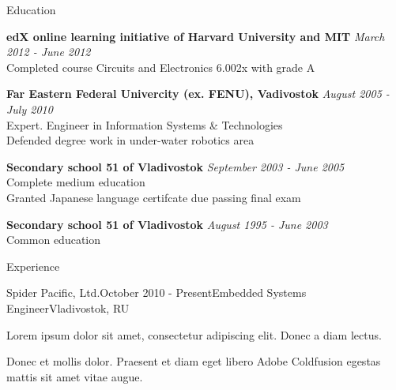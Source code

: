 \documentclass{resume}
\begin{document}

\begin{rSection}{Education}

{\bf edX online learning initiative of Harvard University and MIT} \hfill {\em March 2012 - June 2012} \\
Completed course Circuits and Electronics 6.002x with grade A


{\bf Far Eastern Federal Univercity (ex. FENU), Vadivostok} \hfill {\em August 2005 - July 2010} \\ 
Expert. Engineer in Information Systems \& Technologies \\
Defended degree work in under-water robotics area

{\bf Secondary school 51 of Vladivostok} \hfill {\em September 2003  - June 2005}\\
Complete medium education \\
Granted Japanese language certifcate due passing final exam

{\bf Secondary school 51 of Vladivostok} \hfill {\em August 1995 - June 2003}\\
Common education

\end{rSection}


\begin{rSection}{Experience}

\begin{rSubsection}{Spider Pacific, Ltd.}{October 2010 - Present}{Embedded Systems Engineer}{Vladivostok, RU}
\item Lorem ipsum dolor sit amet, consectetur adipiscing elit. Donec a diam lectus.
\item Donec et mollis dolor. Praesent et diam eget libero Adobe Coldfusion egestas mattis sit amet vitae augue.
\end{rSubsection}

\end{rSection}

\end{document}
